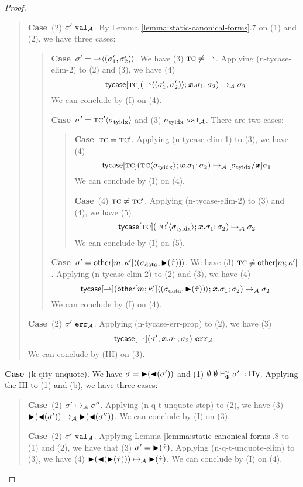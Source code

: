 \documentclass[12pt]{article}
\newcommand{\pfcase}[1]{\textbf{Case}~#1. }
\begin{document}
\begin{proof}
\begin{quote}
    \pfcase{(2) $\sigma'~\mathtt{val}_{\mathcal{A}}$} By Lemma \ref{lemma:static-canonical-forms}.7 on (1) and (2), we have three cases: 
    \begin{quote}
        \pfcase{$\sigma'={\rightharpoonup}\langle(\sigma_1', \sigma_2')\rangle$} We have (3) $\textsc{tc}\neq{\rightharpoonup}$. Applying (n-tycase-elim-2) to (2) and (3), we have (4) $${\sf tycase}[\textsc{tc}]({\rightharpoonup}\langle(\sigma_1', \sigma_2')\rangle; {\textbf{\textit{x}}}.\sigma_1; \sigma_2) \mapsto_{\mathcal{A}} \sigma_2$$ We can conclude by (I) on (4).

        \pfcase{$\sigma'={\textsc{tc}'}\langle\sigma_\text{tyidx}\rangle$ and (3) $\sigma_\text{tyidx}~\mathtt{val}_{\mathcal{A}}$} There are two cases:
        \begin{quote}
            \pfcase{$\textsc{tc}=\textsc{tc}'$} Applying (n-tycase-elim-1) to (3), we have (4) $${\sf tycase}[\textsc{tc}]({\textsc{tc}}\langle\sigma_\text{tyidx}\rangle; {\textbf{\textit{x}}}.\sigma_1; \sigma_2) \mapsto_{\mathcal{A}} [\sigma_\text{tyidx}/{\textbf{\textit{x}}}]\sigma_1$$ We can conclude by (I) on (4).

            \pfcase{(4) $\textsc{tc}\neq\textsc{tc}'$} Applying (n-tycase-elim-2) to (3) and (4), we have (5) $${\sf tycase}[\textsc{tc}]({\textsc{tc}'}\langle\sigma_\text{tyidx}\rangle; {\textbf{\textit{x}}}.\sigma_1; \sigma_2) \mapsto_{\mathcal{A}} \sigma_2$$ We can conclude by (I) on (5).
        \end{quote}

        \pfcase{$\sigma'={{\sf other}[m; \kappa']}\langle(\sigma_\text{data}, {\blacktriangleright}(\hat{\tau}))\rangle$} We have  (3) $\textsc{tc}\neq{\sf other}[m; \kappa']$. Applying (n-tycase-elim-2) to (2) and (3), we have (4) $${\sf tycase}[\rightharpoonup]({{\sf other}[m; \kappa']}\langle(\sigma_\text{data}, {\blacktriangleright}(\hat{\tau}))\rangle; {\textbf{\textit{x}}}.\sigma_1; \sigma_2) \mapsto_{\mathcal{A}} \sigma_2$$ We can conclude by (I) on (4).
    \end{quote}

    \pfcase{(2) $\sigma'~\mathtt{err}_{\mathcal{A}}$} Applying (n-tycase-err-prop) to (2), we have (3) $${\sf tycase}[\rightharpoonup](\sigma'; {\textbf{\textit{x}}}.\sigma_1; \sigma_2)~\mathtt{err}_{\mathcal{A}}$$ We can conclude by (III) on (3). 
\end{quote}

\pfcase{(k-qity-unquote)} We have $\sigma={\blacktriangleright}({\blacktriangleleft}(\sigma'))$ and (1) $\emptyset~\emptyset \vdash_{\Phi}^{n} \sigma' :: {\sf ITy}$. Applying the IH to (1) and (b), we have three cases:

\begin{quote}
    \pfcase{(2) $\sigma' \mapsto_{\mathcal{A}} \sigma''$} Applying (n-q-t-unquote-step) to (2), we have (3) ${\blacktriangleright}({\blacktriangleleft}(\sigma')) \mapsto_{\mathcal{A}} {\blacktriangleright}({\blacktriangleleft}(\sigma''))$. We can conclude by (I) on (3).

    \pfcase{(2) $\sigma'~\mathtt{val}_{\mathcal{A}}$} Applying Lemma \ref{lemma:static-canonical-forms}.8 to (1) and (2), we have that (3) $\sigma'={\blacktriangleright}(\hat{\tau})$. Applying (n-q-t-unquote-elim) to (3), we have (4) ${\blacktriangleright}({\blacktriangleleft}({\blacktriangleright}(\hat{\tau}))) \mapsto_{\mathcal{A}} {\blacktriangleright}(\hat{\tau})$. We can conclude by (I) on (4).


\end{quote}
\end{proof}
\end{document}
